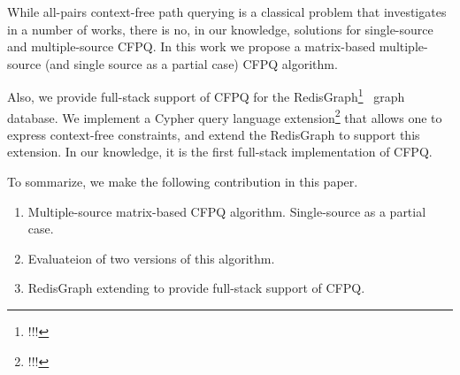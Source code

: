 While all-pairs context-free path querying is a classical problem that investigates in a number of works, there is no, in our knowledge, solutions for single-source and multiple-source CFPQ.
In this work we propose a matrix-based multiple-source (and single source as a partial case) CFPQ algorithm.

Also, we provide full-stack support of CFPQ for the RedisGraph\footnote{!!!}~\cite{!!!} graph database.
We implement a Cypher query language extension\footnote{!!!} that allows one to express context-free constraints, and extend the RedisGraph to support this extension.
In our knowledge, it is the first full-stack implementation of CFPQ.

To sommarize, we make the following contribution in this paper.
\begin{enumerate}
	\item Multiple-source matrix-based CFPQ algorithm. 
	Single-source as a partial case.
	\item Evaluateion of two versions of this algorithm.
	\item RedisGraph extending to provide full-stack support of CFPQ.
\end{enumerate}